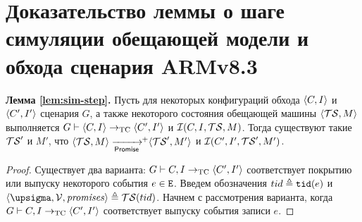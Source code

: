 \chapter{Доказательство леммы о шаге симуляции обещающей модели и обхода сценария ARMv8.3}
\label{sec:sim-step-proof}

  {\bf Лемма \ref{lem:sim-step}.}
  Пусть для некоторых конфигураций обхода ${\langle{C, I}\rangle}$ и ${\langle{C', I'}\rangle}$ сценария $G$,
  а также некоторого состояния обещающей машины ${\langle{\ensuremath{\mathcal{TS}}, M}\rangle}$ выполняется
  $G \vdash {\langle{C, I}\rangle} \rightarrow_{\rm TC} {\langle{C', I'}\rangle}$ и
  $\mathcal{I}(C, I, \mathcal{TS}, M)$.
  Тогда существуют такие $\mathcal{TS}'$ и $M'$, что $\tup{\TSf, M} \stepp\!\!^{+} \tup{\TSf', M'}$ и
  $\mathcal{I}(C', I', \mathcal{TS}', M')$.
\begin{proof}%
  Существует два варианта: $G \vdash C, I \rightarrow_{\rm TC} {\langle{C', I'}\rangle}$ соответствует покрытию или
  выпуску некоторого события $e \in {\mathtt{E}}$. Введем обозначения $tid \triangleq {\mathtt{tid}}(e)$ и
  $\tup{\pstate, \View, \PromSet} \defeq \TSf(tid)$.
  Начнем с рассмотрения варианта, когда $G \vdash C, I \rightarrow_{\rm TC} {\langle{C', I'}\rangle}$ соответствует
  выпуску события записи $e$.


\end{proof}
